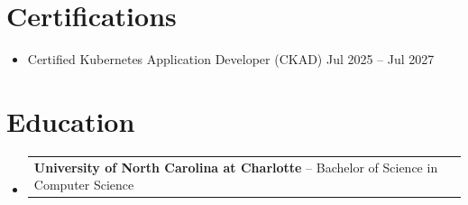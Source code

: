 \documentclass[letterpaper,11pt]{article}
\makeatletter
\newcommand{\resumeItem}[1]{
  \item\small{
    {#1 \vspace{-2pt}}
  }
}
\newcommand{\resumeEducationHeading}[2]{
  \vspace{-2pt}\item
    \begin{tabular*}{0.97\textwidth}[t]{l@{\extracolsep{\fill}}r}
      \textbf{#1} -- #2 \\
    \end{tabular*}\vspace{-7pt}
}
\newcommand{\resumeItemListStart}{\begin{itemize}[label={-}]}
\newcommand{\resumeItemListEnd}{\end{itemize}\vspace{-5pt}}
\newcommand{\resumeSubHeadingListStart}{\begin{itemize}[leftmargin=0.15in, label={}]}
\newcommand{\resumeSubHeadingListEnd}{\end{itemize}}
\makeatother
\begin{document}
\section{Certifications}
 \resumeItemListStart
    \resumeItem{Certified Kubernetes Application Developer (CKAD) \hfill Jul 2025 -- Jul 2027}
  \resumeItemListEnd
\vspace{-7pt}

\section{Education}
  \resumeSubHeadingListStart
    \resumeEducationHeading
      {University of North Carolina at Charlotte}{Bachelor of Science in Computer Science}
  \resumeSubHeadingListEnd
\end{document}
